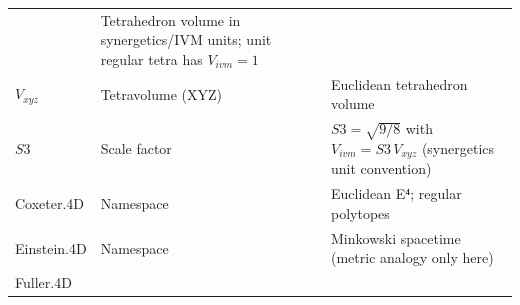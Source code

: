 \documentclass[
  10pt,
]{article}
\begin{document}
\begin{longtable}[]{@{}lll@{}}
\begin{minipage}[t]{0.30\columnwidth}
\end{minipage} & \begin{minipage}[t]{0.30\columnwidth}\raggedright
Tetrahedron volume in synergetics/IVM units; unit regular tetra has
\(V_{ivm}=1\)\strut
\end{minipage}\tabularnewline
\begin{minipage}[t]{0.30\columnwidth}\raggedright
\(V_{xyz}\)\strut
\end{minipage} & \begin{minipage}[t]{0.30\columnwidth}\raggedright
Tetravolume (XYZ)\strut
\end{minipage} & \begin{minipage}[t]{0.30\columnwidth}\raggedright
Euclidean tetrahedron volume\strut
\end{minipage}\tabularnewline
\begin{minipage}[t]{0.30\columnwidth}\raggedright
\(S3\)\strut
\end{minipage} & \begin{minipage}[t]{0.30\columnwidth}\raggedright
Scale factor\strut
\end{minipage} & \begin{minipage}[t]{0.30\columnwidth}\raggedright
\(S3=\sqrt{9/8}\) with \(V_{ivm} = S3\,V_{xyz}\) (synergetics unit
convention)\strut
\end{minipage}\tabularnewline
\begin{minipage}[t]{0.30\columnwidth}\raggedright
Coxeter.4D\strut
\end{minipage} & \begin{minipage}[t]{0.30\columnwidth}\raggedright
Namespace\strut
\end{minipage} & \begin{minipage}[t]{0.30\columnwidth}\raggedright
Euclidean E⁴; regular polytopes\strut
\end{minipage}\tabularnewline
\begin{minipage}[t]{0.30\columnwidth}\raggedright
Einstein.4D\strut
\end{minipage} & \begin{minipage}[t]{0.30\columnwidth}\raggedright
Namespace\strut
\end{minipage} & \begin{minipage}[t]{0.30\columnwidth}\raggedright
Minkowski spacetime (metric analogy only here)\strut
\end{minipage}\tabularnewline
\begin{minipage}[t]{0.30\columnwidth}\raggedright
Fuller.4D\strut
\end{minipage} & \begin{minipage}[t]{0.30\columnwidth}\raggedright

\end{minipage}
\end{longtable}
\end{document}
